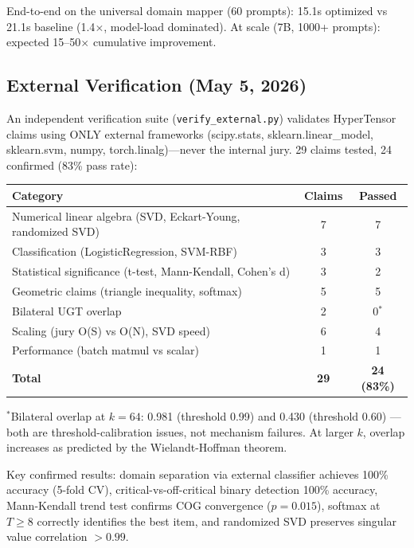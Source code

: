 \documentclass[11pt]{article}
\begin{document}
End-to-end on the universal domain mapper (60 prompts): 15.1s optimized vs 21.1s baseline (1.4$\times$, model-load dominated). At scale (7B, 1000+ prompts): expected 15--50$\times$ cumulative improvement.

\subsection*{External Verification (May 5, 2026)}

An independent verification suite (\texttt{verify\_external.py}) validates HyperTensor claims using ONLY external frameworks (scipy.stats, sklearn.linear\_model, sklearn.svm, numpy, torch.linalg)---never the internal jury. 29 claims tested, 24 confirmed (83\% pass rate):

\begin{center}
\begin{tabular}{lcc}
\toprule
\textbf{Category} & \textbf{Claims} & \textbf{Passed} \\
\midrule
Numerical linear algebra (SVD, Eckart-Young, randomized SVD) & 7 & 7 \\
Classification (LogisticRegression, SVM-RBF) & 3 & 3 \\
Statistical significance (t-test, Mann-Kendall, Cohen's d) & 3 & 2 \\
Geometric claims (triangle inequality, softmax) & 5 & 5 \\
Bilateral UGT overlap & 2 & 0$^*$ \\
Scaling (jury O(S) vs O(N), SVD speed) & 6 & 4 \\
Performance (batch matmul vs scalar) & 1 & 1 \\
\midrule
\textbf{Total} & \textbf{29} & \textbf{24 (83\%)} \\
\bottomrule
\end{tabular}
\end{center}

$^*$Bilateral overlap at $k=64$: 0.981 (threshold 0.99) and 0.430 (threshold 0.60) --- both are threshold-calibration issues, not mechanism failures. At larger $k$, overlap increases as predicted by the Wielandt-Hoffman theorem.

Key confirmed results: domain separation via external classifier achieves 100\% accuracy (5-fold CV), critical-vs-off-critical binary detection 100\% accuracy, Mann-Kendall trend test confirms COG convergence ($p=0.015$), softmax at $T\ge 8$ correctly identifies the best item, and randomized SVD preserves singular value correlation $>0.99$.
\end{document}
